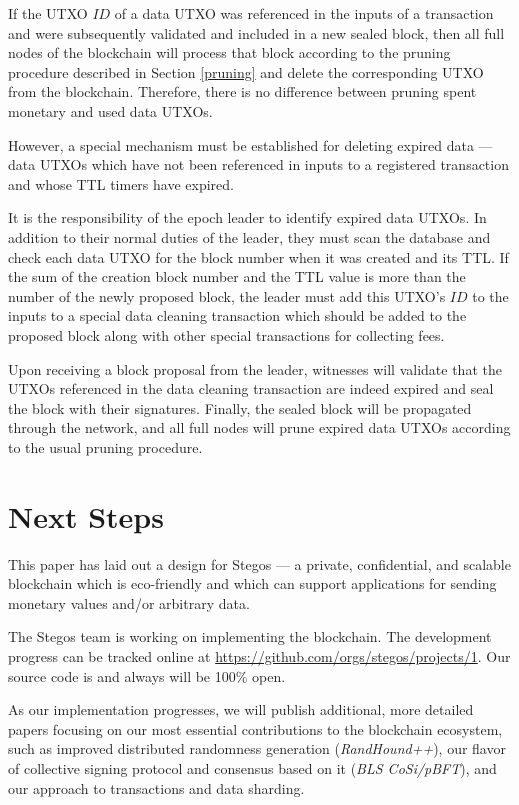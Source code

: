 \documentclass[a4paper, 10pt, conference]{ieeeconf}
\begin{document}
If the UTXO $ID$ of a data UTXO was referenced in the inputs of a transaction and were subsequently validated and included in a new sealed block, then all full nodes of the blockchain will process that block according to the pruning procedure described in Section \ref{pruning} and delete the corresponding UTXO from the blockchain. Therefore, there is no difference between pruning spent monetary and used data UTXOs.

However, a special mechanism must be established for deleting expired data --- data UTXOs which have not been referenced in inputs to a registered transaction and whose TTL timers have expired.

It is the responsibility of the epoch leader to identify expired data UTXOs. In addition to their normal duties of the leader, they must scan the database and check each data UTXO for the block number when it was created and its TTL. If the sum of the creation block number and the TTL value is more than the number of the newly proposed block, the leader must add this UTXO's $ID$ to the inputs to a special data cleaning transaction which should be added to the proposed block along with other special transactions for collecting fees. 

Upon receiving a block proposal from the leader, witnesses will validate that the UTXOs referenced in the data cleaning transaction are indeed expired and seal the block with their signatures. Finally, the sealed block will be propagated through the network, and all full nodes will prune expired data UTXOs according to the usual pruning procedure.

\section{Next Steps}

This paper has laid out a design for Stegos --- a private, confidential, and scalable blockchain which is eco-friendly and which can support applications for sending monetary values and/or arbitrary data.

The Stegos team is working on implementing the blockchain. The development progress can be tracked online at \url{https://github.com/orgs/stegos/projects/1}. Our source code is and always will be 100\% open.

As our implementation progresses, we will publish additional, more detailed papers focusing on our most essential contributions to the blockchain ecosystem, such as improved distributed randomness generation (\textit{RandHound++}), our flavor of collective signing protocol and consensus based on it (\textit{BLS CoSi/pBFT}), and our approach to transactions and data sharding. 
\end{document}
